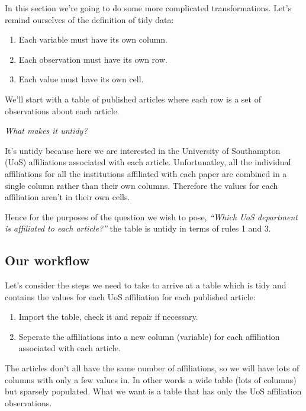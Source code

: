 \documentclass[
  letterpaper,
  DIV=11,
  numbers=noendperiod]{scrreprt}
\providecommand{\tightlist}{%
  \setlength{\itemsep}{0pt}\setlength{\parskip}{0pt}}\usepackage{longtable,booktabs,array}
\begin{document}
In this section we're going to do some more complicated transformations.
Let's remind ourselves of the definition of tidy data:

\begin{enumerate}
\def\labelenumi{\arabic{enumi}.}
\tightlist
\item
  Each variable must have its own column.
\item
  Each observation must have its own row.
\item
  Each value must have its own cell.
\end{enumerate}

We'll start with a table of published articles where each row is a set
of observations about each article.

\emph{What makes it untidy?}

It's untidy because here we are interested in the University of
Southampton (UoS) affiliations associated with each article.
Unfortunatley, all the individual affiliations for all the institutions
affiliated with each paper are combined in a single column rather than
their own columns. Therefore the values for each affiliation aren't in
their own cells.

Hence for the purposes of the question we wish to pose, \emph{``Which
UoS department is affiliated to each article?''} the table is untidy in
terms of rules 1 and 3.

\hypertarget{our-workflow}{%
\subsection{Our workflow}\label{our-workflow}}

Let's consider the steps we need to take to arrive at a table which is
tidy and contains the values for each UoS affiliation for each published
article:

\begin{enumerate}
\def\labelenumi{\arabic{enumi}.}
\tightlist
\item
  Import the table, check it and repair if necessary.
\item
  Seperate the affiliations into a new column (variable) for each
  affiliation associated with each article.
\end{enumerate}

The articles don't all have the same number of affiliations, so we will
have lots of columns with only a few values in. In other words a wide
table (lots of columns) but sparsely populated. What we want is a table
that has only the UoS affiliation observations.
\end{document}
